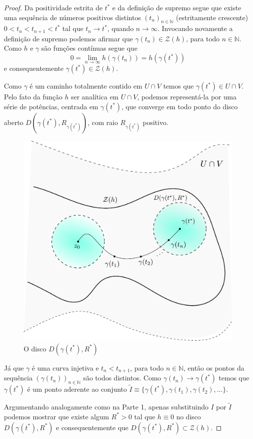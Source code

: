 \begin{proof}
\medskip 




Da positividade estrita de $t^{*}$ e da definição de supremo segue 
que existe uma sequência de números positivos
distintos $(t_n)_{n\in\mathbb{N}}$ (estritamente crescente) $0<t_n< t_{n+1}<t^{*}$ tal que $t_n\to t^{*}$, quando $n\to\infty$. 
Invocando novamente a definição de supremo podemos afirmar que 
$\gamma(t_n)\in \mathcal{Z}(h)$, para todo $n\in\mathbb{N}$.
Como $h$ e $\gamma$ são funções contínuas segue que
\[
0
=
\lim_{n\to\infty} h(\gamma(t_n))
= 
h(\gamma(t^{*}))
\]
e consequentemente $\gamma(t^{*})\in\mathcal{Z}(h)$. 

Como $\gamma$ é um caminho totalmente contido em $U\cap V$ temos
que $\gamma(t^{*})\in U\cap V$. Pelo fato da função $h$ ser analítica em 
$U\cap V$, podemos representá-la por uma série de potências, centrada 
em $\gamma(t^{*})$, que converge em 
todo ponto do disco aberto $D( \gamma(t^{*}), R_{\gamma(t^{*})})$, 
com raio $R_{\gamma(t^{*})}$ positivo. 


\begin{figure}[h]
\centering
\includegraphics[width=0.6\linewidth]{Figuras/zeros-isolados6}
\caption{O disco $D(\gamma(t^{*}),R^{*})$}
\label{fig:zeros-isolados6}
\end{figure}



Já que $\gamma$ é uma curva injetiva  e $t_n<t_{n+1}$, para todo $n\in\mathbb{N}$,
então os pontos da sequência $(\gamma(t_n))_{n\in\mathbb{N}}$ são todos
distintos. Como $\gamma(t_n)\to \gamma(t^{*})$ temos que $\gamma(t^{*})$
é um ponto aderente ao conjunto $\widetilde{I}\equiv \{\gamma(t^{*}),\gamma(t_1),\gamma(t_2),\ldots\}$.

Argumentando analogamente como na Parte 1, apenas substituindo $I$ por $\widetilde{I}$ 
podemos mostrar que existe algum $R^*>0$ tal que $h\equiv 0$
no disco $D(\gamma(t^*),R^{*})$ e consequentemente que 
$D(\gamma(t^*),R^{*})\subset\mathcal{Z}(h)$.


\end{proof}
